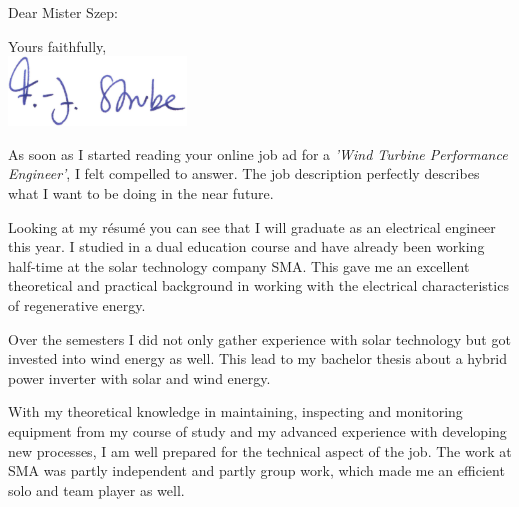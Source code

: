 \documentclass[11pt,a4paper,sans]{moderncv}        %
\begin{document}
\date{January 5, 2016}
\opening{Dear Mister Szep:}
\closing{Yours faithfully,\vspace{.1cm} \\ \includegraphics[height=5em]{bilder/signature} \vspace*{-1cm}}
\makelettertitle

As soon as I started reading your online job ad for a \textit{'Wind Turbine Performance Engineer'}, I felt compelled to answer. The job description perfectly describes what I want to be doing in the near future. 

Looking at my résumé you can see that I will graduate as an electrical engineer this year. I studied in a dual education course and have already been working half-time at the solar technology company SMA. This gave me an excellent theoretical and practical background in working with the electrical characteristics of regenerative energy. 

Over the semesters I did not only gather experience with solar technology but got invested into wind energy as well. This lead to my bachelor thesis about a hybrid power inverter with solar and wind energy.

With my theoretical knowledge in maintaining, inspecting and monitoring equipment from my course of study and my advanced experience with developing new processes, I am well prepared for the technical aspect of the job. The work at SMA was partly independent and partly group work, which made me an efficient solo and team player as well.
\end{document}
